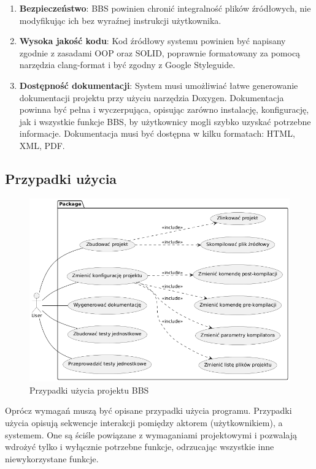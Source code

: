 \begin{enumerate}
    \item \textbf{Bezpieczeństwo}: BBS powinien chronić integralność plików źródłowych, nie modyfikując ich bez wyraźnej instrukcji użytkownika.
    \item \textbf{Wysoka jakość kodu}: Kod źródłowy systemu powinien być napisany zgodnie z zasadami OOP oraz SOLID, poprawnie formatowany za pomocą narzędzia clang-format i być zgodny z Google Styleguide.
    \item \textbf{Dostępność dokumentacji}: System musi umożliwiać łatwe generowanie dokumentacji projektu przy użyciu narzędzia Doxygen. Dokumentacja powinna być pełna i wyczerpująca, opisując zarówno instalację, konfigurację, jak i wszystkie funkcje BBS, by użytkownicy mogli szybko uzyskać potrzebne informacje. Dokumentacja musi być dostępna w kilku formatach: HTML, XML, PDF.
\end{enumerate}

\subsection{Przypadki użycia}
\begin{figure}[h]
    \centering
    \includegraphics[width=\textwidth]{Images/use-case.png}
    \caption{Przypadki użycia projektu BBS}
\end{figure}

Oprócz wymagań muszą być opisane przypadki użycia programu. Przypadki użycia opisują sekwencje interakcji pomiędzy aktorem (użytkownikiem), a systemem. One są ściśle powiązane z wymaganiami projektowymi i pozwalają wdrożyć tylko i wyłącznie potrzebne funkcje, odrzucając wszystkie inne niewykorzystane funkcje.

